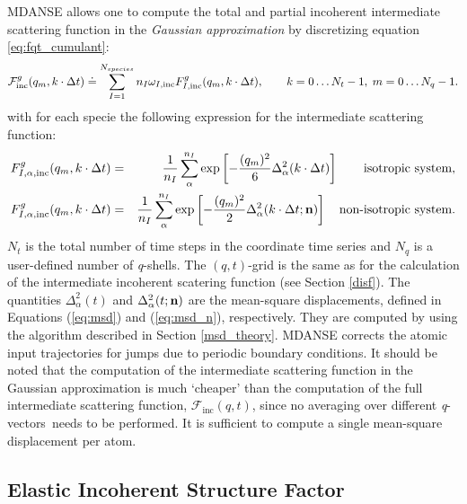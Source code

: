 \documentclass[a4paper,11pt]{article}
\newcommand{\qvects}{\textit{q}-vectors}
\newcommand{\qshells}{\textit{q}-shells}
\begin{document}
\gls{MDANSE} allows one to compute the total and partial incoherent intermediate scattering function in the
{\em Gaussian approximation} by discretizing equation \ref{eq:fqt_cumulant}:
\begin{equation}
{\cal F}^{g}_{\mathrm{inc}}(q_m,k\cdot\Delta t) \doteq \sum\limits^{N_{species}}_{I = 1} n_I \omega_{I,\mathrm{inc}} F^{g}_{I, \mathrm{inc}}(q_m,k\cdot\Delta t),
\qquad k = 0\ldots N_t - 1,\; m = 0\ldots N_q - 1.
\end{equation}
with for each specie the following expression for the intermediate scattering function:
\begin{eqnarray}
F^{g}_{I,\alpha ,\mathrm{inc}}(q_m,k\cdot\Delta t) &=& \frac{1}{n_I}\sum\limits^{n_I}_{\alpha} \exp\left[-\frac{(q_m)^2}{6}
  \Delta^2_\alpha(k\cdot\Delta t)\right]
\qquad\mbox{{\rm isotropic system}},\\
F^{g}_{I,\alpha ,\mathrm{inc}}(q_m,k\cdot\Delta t) &=& \frac{1}{n_I}\sum\limits^{n_I}_{\alpha} \exp\left[-\frac{(q_m)^2}{2}
  \Delta^2_\alpha(k\cdot\Delta t;{\bf n})\right]
\quad\mbox{{\rm non-isotropic system}}.
\end{eqnarray}
$N_t$ is the total number of time steps in the coordinate time series and $N_q$ is a user-defined number of \qshells.
The $(q,t)$-grid is the same as for the calculation of the intermediate incoherent scatering function (see Section \ref{disf}).
The quantities $\Delta^2_\alpha(t)$ and $\Delta^2_\alpha(t;{\bf n})$ are the mean-square displacements, defined in
Equations (\ref{eq:msd}) and (\ref{eq:msd_n}), respectively. They are computed by using the algorithm described in Section
\ref{msd_theory}. \gls{MDANSE} corrects the atomic input trajectories for jumps due to periodic boundary conditions. It should
be noted that the computation of the intermediate scattering function in the Gaussian approximation is much `cheaper' than
the computation of the full intermediate scattering function, $\mathcal{F}_{\mathrm{inc}}(q,t)$, since no averaging over different
\qvects\ needs to be performed. It is sufficient to compute a single mean-square displacement per atom.


\subsection{Elastic Incoherent Structure Factor}
\label{eisf}
\end{document}
